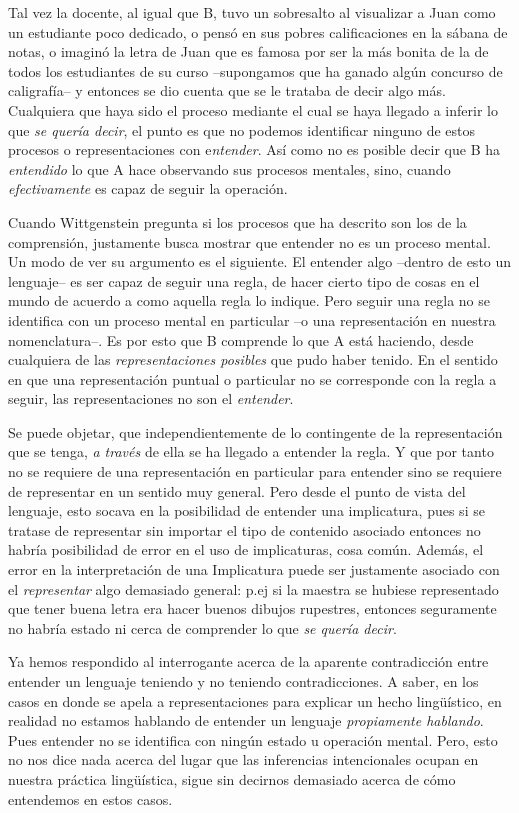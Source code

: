 \documentclass[]{book}
\begin{document}
\begin{refsection}
Tal vez la docente, al igual que B, tuvo un sobresalto al visualizar a
Juan como un estudiante poco dedicado, o pensó en sus pobres
calificaciones en la sábana de notas, o imaginó la letra de Juan que es
famosa por ser la más bonita de la de todos los estudiantes de su curso
--supongamos que ha ganado algún concurso de caligrafía-- y entonces se
dio cuenta que se le trataba de decir algo más. Cualquiera que haya sido
el proceso mediante el cual se haya llegado a inferir lo que \emph{se
quería decir}, el punto es que no podemos identificar ninguno de estos
procesos o representaciones con e\emph{ntender}. Así como no es posible
decir que B ha \emph{entendido} lo que A hace observando sus procesos
mentales, sino, cuando \emph{efectivamente} es capaz de seguir la
operación.

Cuando Wittgenstein pregunta si los procesos que ha descrito son los de
la comprensión, justamente busca mostrar que entender no es un proceso
mental. Un modo de ver su argumento es el siguiente. El entender algo
--dentro de esto un lenguaje-- es ser capaz de seguir una regla, de
hacer cierto tipo de cosas en el mundo de acuerdo a como aquella regla
lo indique. Pero seguir una regla no se identifica con un proceso mental
en particular --o una representación en nuestra nomenclatura--. Es por
esto que B comprende lo que A está haciendo, desde cualquiera de las
\emph{representaciones posibles} que pudo haber tenido. En el sentido en
que una representación puntual o particular no se corresponde con la
regla a seguir, las representaciones no son el \emph{entender}.

Se puede objetar, que independientemente de lo contingente de la
representación que se tenga, \emph{a través} de ella se ha llegado a
entender la regla. Y que por tanto no se requiere de una representación
en particular para entender sino se requiere de representar en un
sentido muy general. Pero desde el punto de vista del lenguaje, esto
socava en la posibilidad de entender una implicatura, pues si se tratase
de representar sin importar el tipo de contenido asociado entonces no
habría posibilidad de error en el uso de implicaturas, cosa común.
Además, el error en la interpretación de una Implicatura puede ser
justamente asociado con el \emph{representar} algo demasiado general:
p.ej si la maestra se hubiese representado que tener buena letra era
hacer buenos dibujos rupestres, entonces seguramente no habría estado ni
cerca de comprender lo que \emph{se quería decir}.

Ya hemos respondido al interrogante acerca de la aparente contradicción
entre entender un lenguaje teniendo y no teniendo contradicciones. A
saber, en los casos en donde se apela a representaciones para explicar
un hecho lingüístico, en realidad no estamos hablando de entender un
lenguaje \emph{propiamente hablando}. Pues entender no se identifica con
ningún estado u operación mental. Pero, esto no nos dice nada acerca del
lugar que las inferencias intencionales ocupan en nuestra práctica
lingüística, sigue sin decirnos demasiado acerca de cómo entendemos en
estos casos.


\end{refsection}
\end{document}
